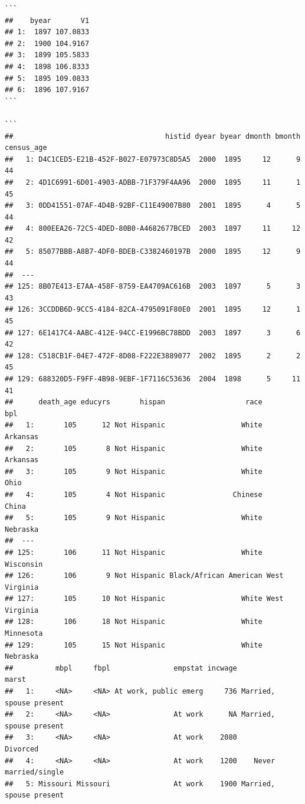 \documentclass[]{book}
\begin{document}
\begin{verbatim}
```
##    byear       V1
## 1:  1897 107.0833
## 2:  1900 104.9167
## 3:  1899 105.5833
## 4:  1898 106.8333
## 5:  1895 109.0833
## 6:  1896 107.9167
```

```
##                                    histid dyear byear dmonth bmonth census_age
##   1: D4C1CED5-E21B-452F-B027-E07973C8D5A5  2000  1895     12      9         44
##   2: 4D1C6991-6D01-4903-ADBB-71F379F4AA96  2000  1895     11      1         45
##   3: 0DD41551-07AF-4D4B-92BF-C11E49007B80  2001  1895      4      5         44
##   4: 800EEA26-72C5-4DED-80B0-A4682677BCED  2003  1897     11     12         42
##   5: 85077BBB-A8B7-4DF0-BDEB-C3382460197B  2000  1895     12      9         44
##  ---                                                                          
## 125: 8B07E413-E7AA-458F-8759-EA4709AC616B  2003  1897      5      3         43
## 126: 3CCDDB6D-9CC5-4184-82CA-4795091F80E0  2001  1895     12      1         45
## 127: 6E1417C4-AABC-412E-94CC-E1996BC78BDD  2003  1897      3      6         42
## 128: C518CB1F-04E7-472F-8D08-F222E3889077  2002  1895      2      2         45
## 129: 688320D5-F9FF-4B98-9EBF-1F7116C53636  2004  1898      5     11         41
##      death_age educyrs       hispan                   race           bpl
##   1:       105      12 Not Hispanic                  White      Arkansas
##   2:       105       8 Not Hispanic                  White      Arkansas
##   3:       105       9 Not Hispanic                  White          Ohio
##   4:       105       4 Not Hispanic                Chinese         China
##   5:       105       9 Not Hispanic                  White      Nebraska
##  ---                                                                    
## 125:       106      11 Not Hispanic                  White     Wisconsin
## 126:       106       9 Not Hispanic Black/African American West Virginia
## 127:       105      10 Not Hispanic                  White West Virginia
## 128:       106      18 Not Hispanic                  White     Minnesota
## 129:       105      15 Not Hispanic                  White      Nebraska
##          mbpl     fbpl               empstat incwage                   marst
##   1:     <NA>     <NA> At work, public emerg     736 Married, spouse present
##   2:     <NA>     <NA>               At work      NA Married, spouse present
##   3:     <NA>     <NA>               At work    2080                Divorced
##   4:     <NA>     <NA>               At work    1200    Never married/single
##   5: Missouri Missouri               At work    1900 Married, spouse present

\end{verbatim}
\end{document}
